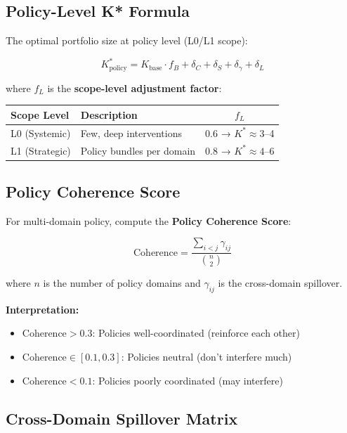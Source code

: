 \subsection{Policy-Level K* Formula}

The optimal portfolio size at policy level (L0/L1 scope):

\begin{equation}
\boxed{
K^*_{\text{policy}} = K_{\text{base}} \cdot f_B + \delta_C + \delta_S + \delta_\gamma + \delta_L
}
\end{equation}

where $f_L$ is the \textbf{scope-level adjustment factor}:

\begin{center}
\begin{tabular}{@{}llc@{}}
\toprule
\textbf{Scope Level} & \textbf{Description} & \textbf{$f_L$} \\
\midrule
L0 (Systemic) & Few, deep interventions & 0.6 → $K^* \approx 3$--4 \\
L1 (Strategic) & Policy bundles per domain & 0.8 → $K^* \approx 4$--6 \\
\bottomrule
\end{tabular}
\end{center}

\subsection{Policy Coherence Score}

For multi-domain policy, compute the \textbf{Policy Coherence Score}:

\begin{equation}
\boxed{
\text{Coherence} = \frac{\sum_{i < j} \gamma_{ij}}{\binom{n}{2}}
}
\end{equation}

where $n$ is the number of policy domains and $\gamma_{ij}$ is the cross-domain spillover.

\textbf{Interpretation:}
\begin{itemize}[nosep]
\item $\text{Coherence} > 0.3$: Policies well-coordinated (reinforce each other)
\item $\text{Coherence} \in [0.1, 0.3]$: Policies neutral (don't interfere much)
\item $\text{Coherence} < 0.1$: Policies poorly coordinated (may interfere)
\end{itemize}

\subsection{Cross-Domain Spillover Matrix}

